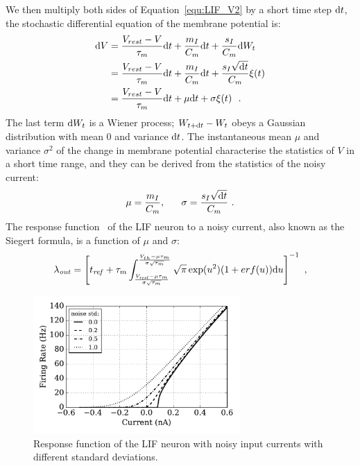 	We then multiply both sides of Equation~\ref{equ:LIF_V2} by a short time step $\mathrm{d} t$, the stochastic differential equation of the membrane potential is: %
	\begin{equation}
	\begin{aligned}
	\mathrm{d} V&= \frac{V_{rest} - V}{\tau_m }\mathrm{d} t + \frac{m_I}{C_m} \mathrm{d} t + \frac{s_I}{C_m}  \mathrm{d} W_t \\
	&=\frac{V_{rest} - V}{\tau_m }\mathrm{d} t + \frac{m_I}{C_m} \mathrm{d} t + \frac{s_I \sqrt{\mathrm{d} t}}{C_m} \xi(t)  \\
	&=\frac{V_{rest} - V}{\tau_m }\mathrm{d} t + \mu \mathrm{d} t + \sigma \xi(t) ~~. 
	\end{aligned}
	\end{equation}	
	The last term $\mathrm{d} W_t$ is a Wiener process; $W_{t +\mathrm{d} t} - W_{t}$ obeys a Gaussian distribution with mean 0 and variance $\mathrm{d} t$.
	The instantaneous mean $\mu$ and variance $\sigma^2$ of the change in membrane potential characterise the statistics of $V$ in a short time range, and they can be derived from the statistics of the noisy current:
	\begin{equation}
	\mu =\dfrac{m_I}{C_m}, ~~~~~ \sigma = \dfrac{s_I \sqrt{\mathrm{d} t}}{C_m}~.
	\end{equation}
	The response function~\cite{rauch2003neocortical,la2008response} of the LIF neuron to a noisy current, also known as the Siegert formula, is a function of $\mu$ and $\sigma$:
	\begin{equation}
	\lambda_\mathit{out}=
	\left [ t_\mathit{ref}+\tau_m \int_{\frac{V_\mathit{rest}-\mu \tau_m }{\sigma \sqrt{\tau_m}}}^{\frac{V_{th}-\mu \tau_m }{\sigma \sqrt{\tau_m}}} \sqrt{\pi} \exp(u^{2}) (1+erf(u)) \mathrm{d} u \right ]^{-1} ~,
	\label{equ:siegert}
	\end{equation}
	

	
	\begin{figure}[bt]
		\centering
		\includegraphics[width=0.7\textwidth]{pics_iconip/1.pdf}
		\caption{Response function of the LIF neuron with noisy input currents with different standard deviations.}
		\label{Fig:physics}
	\end{figure}
	

